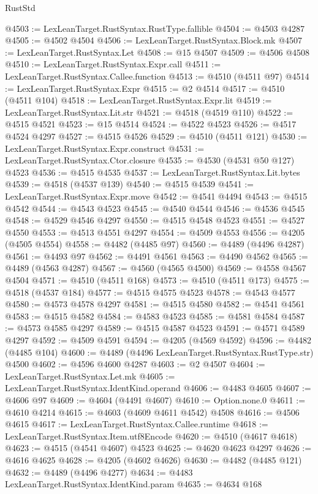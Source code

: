 \begin{lexlean}{RustStd}
\begin{coremodule}
@4503 := LexLeanTarget.RustSyntax.RustType.fallible
@4504 := @4503 @4287
@4505 := @4502 @4504
@4506 := LexLeanTarget.RustSyntax.Block.mk
@4507 := LexLeanTarget.RustSyntax.Let
@4508 := @15 @4507
@4509 := @4506 @4508
@4510 := LexLeanTarget.RustSyntax.Expr.call
@4511 := LexLeanTarget.RustSyntax.Callee.function
@4513 := @4510 (@4511 @97)
@4514 := LexLeanTarget.RustSyntax.Expr
@4515 := @2 @4514
@4517 := @4510 (@4511 @104)
@4518 := LexLeanTarget.RustSyntax.Expr.lit
@4519 := LexLeanTarget.RustSyntax.Lit.str
@4521 := @4518 (@4519 @110)
@4522 := @4515 @4521
@4523 := @15 @4514
@4524 := @4522 @4523
@4526 := @4517 @4524 @4297
@4527 := @4515 @4526
@4529 := @4510 (@4511 @121)
@4530 := LexLeanTarget.RustSyntax.Expr.construct
@4531 := LexLeanTarget.RustSyntax.Ctor.closure
@4535 := @4530 (@4531 @50 @127) @4523
@4536 := @4515 @4535
@4537 := LexLeanTarget.RustSyntax.Lit.bytes
@4539 := @4518 (@4537 @139)
@4540 := @4515 @4539
@4541 := LexLeanTarget.RustSyntax.Expr.move
@4542 := @4541 @4494
@4543 := @4515 @4542
@4544 := @4543 @4523
@4545 := @4540 @4544
@4546 := @4536 @4545
@4548 := @4529 @4546 @4297
@4550 := @4515 @4548 @4523
@4551 := @4527 @4550
@4553 := @4513 @4551 @4297
@4554 := @4509 @4553
@4556 := @4205 (@4505 @4554)
@4558 := @4482 (@4485 @97)
@4560 := @4489 (@4496 @4287)
@4561 := @4493 @97
@4562 := @4491 @4561
@4563 := @4490 @4562
@4565 := @4489 (@4563 @4287)
@4567 := @4560 (@4565 @4500)
@4569 := @4558 @4567 @4504
@4571 := @4510 (@4511 @168)
@4573 := @4510 (@4511 @173)
@4575 := @4518 (@4537 @184)
@4577 := @4515 @4575 @4523
@4578 := @4543 @4577
@4580 := @4573 @4578 @4297
@4581 := @4515 @4580
@4582 := @4541 @4561
@4583 := @4515 @4582
@4584 := @4583 @4523
@4585 := @4581 @4584
@4587 := @4573 @4585 @4297
@4589 := @4515 @4587 @4523
@4591 := @4571 @4589 @4297
@4592 := @4509 @4591
@4594 := @4205 (@4569 @4592)
@4596 := @4482 (@4485 @104)
@4600 := @4489 (@4496 LexLeanTarget.RustSyntax.RustType.str) @4500
@4602 := @4596 @4600 @4287
@4603 := @2 @4507
@4604 := LexLeanTarget.RustSyntax.Let.mk
@4605 := LexLeanTarget.RustSyntax.IdentKind.operand
@4606 := @4483 @4605
@4607 := @4606 @97
@4609 := @4604 (@4491 @4607)
@4610 := Option.none.{0}
@4611 := @4610 @4214
@4615 := @4603 (@4609 @4611 @4542) @4508
@4616 := @4506 @4615
@4617 := LexLeanTarget.RustSyntax.Callee.runtime
@4618 := LexLeanTarget.RustSyntax.Item.utf8Encode
@4620 := @4510 (@4617 @4618)
@4623 := @4515 (@4541 @4607) @4523
@4625 := @4620 @4623 @4297
@4626 := @4616 @4625
@4628 := @4205 (@4602 @4626)
@4630 := @4482 (@4485 @121)
@4632 := @4489 (@4496 @4277)
@4634 := @4483 LexLeanTarget.RustSyntax.IdentKind.param
@4635 := @4634 @168

\end{coremodule}
\end{lexlean}
